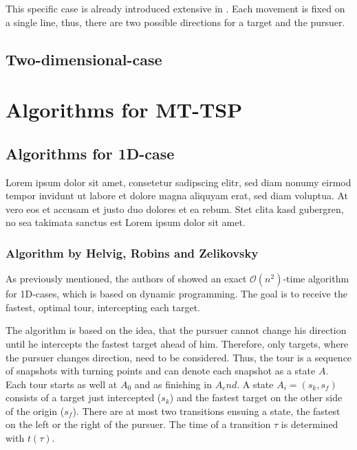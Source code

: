 \documentclass{acm_proc_article-sp}
\begin{document}
This specific case is already introduced extensive in \cite{helvig}. Each movement is fixed on a single line, thus, there are two possible directions for a target and the pursuer. 



\subsection{Two-dimensional-case}







\section{Algorithms for MT-TSP}


\subsection{Algorithms for 1D-case}
Lorem ipsum dolor sit amet, consetetur sadipscing elitr, sed diam nonumy eirmod tempor invidunt ut labore et dolore magna aliquyam erat, sed diam voluptua. At vero eos et accusam et justo duo dolores et ea rebum. Stet clita kasd gubergren, no sea takimata sanctus est Lorem ipsum dolor sit amet.


\subsubsection{Algorithm by Helvig, Robins and Zelikovsky}
As previously mentioned, the authors of \cite{helvig} showed an exact $\mathcal{O}(n^2)$-time algorithm for 1D-cases, which is based on dynamic programming. The goal is to receive the fastest, optimal tour, intercepting each target. 

The algorithm is based on the idea, that the pursuer cannot change his direction until he intercepts the fastest target ahead of him. Therefore, only targets, where the pursuer changes direction, need to be considered. Thus, the tour is a sequence of snapshots with turning points and can denote each snapshot as a state $A$. Each tour starts as well at $A_0$ and as finishing in $A_end$. A state $A_i=(s_k, s_f)$ consists of a target just intercepted ($s_k$) and the fastest target on the other side of the origin ($s_f$). There are at most two transitions ensuing a state, the fastest on the left or the right of the pursuer. The time of a transition $\tau$ is determined with $t(\tau)$. 
\end{document}
